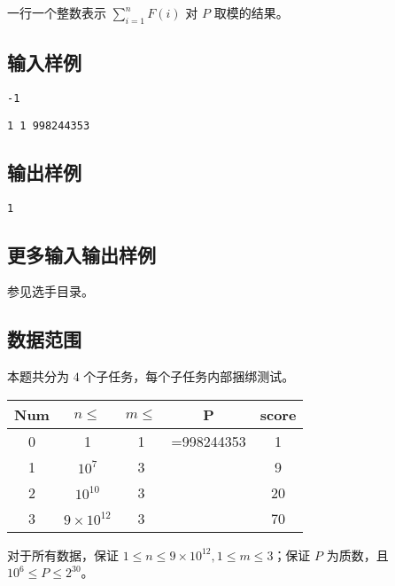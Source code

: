 \documentclass[UTF8]{article}
\begin{document}
一行一个整数表示 $\sum\limits_{i=1}^n F(i)$ 对 $P$  取模的结果。

\subsection{输入样例}

\texttt{-1}

\texttt{1 1 998244353}

\subsection{输出样例}

\texttt{1}

\subsection{更多输入输出样例}
	参见选手目录。

\subsection{数据范围}

本题共分为 $4$ 个子任务，每个子任务内部捆绑测试。

\begin{tabular}{|c|c|c|c|c|}
	\hline
	Num & $n \leq$ & $m \leq$ & P & score\\
	\hline
	0 & 1 & 1 & =998244353 & 1\\
	\hline
	1 & $10^7$ & 3 & & 9\\
	\hline
	2 & $10^{10}$ & 3 & & 20\\
	\hline
	3 & $9\times10^{12}$ & 3 &  & 70\\
	\hline
\end{tabular}

对于所有数据，保证 $1\leq n \leq 9\times10^{12},1\leq m \leq 3$；保证 $P$ 为质数，且 $10^6 \leq P \leq 2^{30}$。
\end{document}
